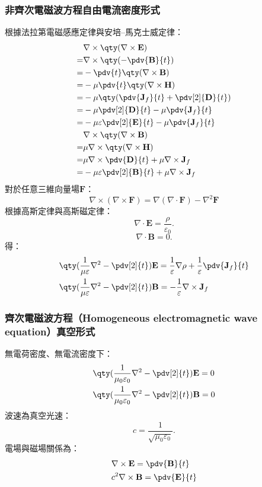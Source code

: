 \documentclass[a4paper,12pt]{report}
\begin{document}
\begin{itemize}
\subsubsection{非齊次電磁波方程自由電流密度形式}
根據法拉第電磁感應定律與安培–馬克士威定律：
\[\begin{aligned}
& \nabla\times\qty(\nabla\times\mathbf{E})\\
=& \nabla\times\qty(-\pdv{\mathbf{B}}{t})\\
=& -\pdv{t}\qty(\nabla\times\mathbf{B})\\
=& -\mu\pdv{t}\qty(\nabla\times\mathbf{H})\\
=& -\mu\qty(\pdv{\mathbf{J}_f}{t}+ \pdv[2]{\mathbf{D}}{t})\\
=& -\mu\pdv[2]{\mathbf{D}}{t}-\mu\pdv{\mathbf{J}_f}{t}\\
=& -\mu\varepsilon\pdv[2]{\mathbf{E}}{t}-\mu\pdv{\mathbf{J}_f}{t}\\
& \nabla\times\qty(\nabla\times\mathbf{B})\\
=& \mu\nabla\times\qty(\nabla\times\mathbf{H})\\
=& \mu\nabla\times\pdv{\mathbf{D}}{t}+\mu\nabla\times\mathbf{J}_f\\
=& -\mu\varepsilon\pdv[2]{\mathbf{B}}{t}+\mu\nabla\times\mathbf{J}_f\\
\end{aligned}\]
對於任意三維向量場$\mathbf{F}$：
\[\nabla\times\left(\nabla\times\mathbf{F}\right)=\nabla\left(\nabla\cdot\mathbf{F}\right)-\nabla^2\mathbf{F}\]
根據高斯定律與高斯磁定律：
\[\nabla\cdot\mathbf{E}=\frac{\rho}{\varepsilon_0}.\]
\[\nabla\cdot\mathbf{B}=0.\]
得：
\[\begin{aligned}
& \qty(\frac{1}{\mu\varepsilon}\nabla^2-\pdv[2]{t})\mathbf{E}=\frac{1}{\varepsilon}\nabla\rho+\frac{1}{\varepsilon}\pdv{\mathbf{J}_f}{t}\\
& \qty(\frac{1}{\mu\varepsilon}\nabla^2-\pdv[2]{t})\mathbf{B}=-\frac{1}{\varepsilon}\nabla\times\mathbf{J}_f
\end{aligned}\]
\subsubsection{齊次電磁波方程（Homogeneous electromagnetic wave equation）真空形式}
無電荷密度、無電流密度下：
\[\begin{aligned}
& \qty(\frac{1}{\mu_0\varepsilon_0}\nabla^2-\pdv[2]{t})\mathbf{E}=0\\
& \qty(\frac{1}{\mu_0\varepsilon_0}\nabla^2-\pdv[2]{t})\mathbf{B}=0
\end{aligned}\]
波速為真空光速：
\[c=\frac{1}{\sqrt{\mu_0\varepsilon_0}}.\]
電場與磁場關係為：
\[\begin{aligned}
&\nabla\times\mathbf{E}=\pdv{\mathbf{B}}{t}\\
&c^2\nabla\times\mathbf{B}=\pdv{\mathbf{E}}{t}
\end{aligned}\]

\end{itemize}
\end{document}
